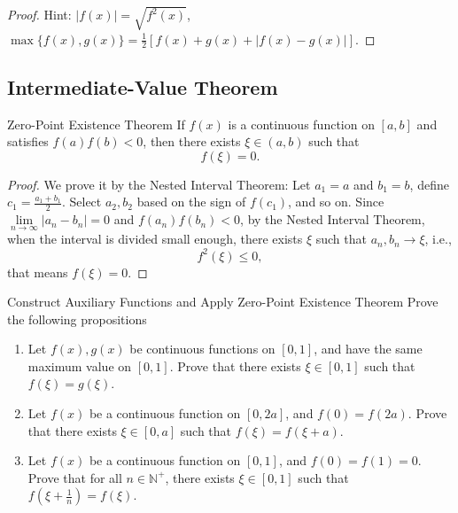 \begin{proof}
  Hint: $|f(x)| = \sqrt{f^2(x)}$,
  $\max \{f(x), g(x)\} = \frac{1}{2} \left[f(x) + g(x) + |f(x) - g(x)| \right]$.
\end{proof}

\subsection{Intermediate-Value Theorem}

\begin{theorem}{Zero-Point Existence Theorem}{}
  If $f(x)$ is a continuous function on $[a, b]$ and satisfies $f(a)f(b) < 0$,
  then there exists $\xi \in (a, b)$ such that
  \begin{equation}
    f(\xi) = 0.
  \end{equation}
\end{theorem}

\begin{proof}
  We prove it by the Nested Interval Theorem:
  Let $a_1 = a$ and $b_1 = b$, define $c_1 = \frac{a_1 + b_1}{2}$.
  Select $a_2, b_2$ based on the sign of $f(c_1)$,
  and so on.
  Since $\lim \limits _{n \rightarrow \infty} |a_n - b_n| = 0$ and $f(a_n)f(b_n)
  < 0$, by the Nested Interval Theorem,
  when the interval is divided small enough,
  there exists $\xi$ such that $a_n, b_n \rightarrow \xi$, i.e.,
  \begin{equation}
    f^2(\xi) \leq 0,
  \end{equation}
  that means $f(\xi) = 0$.
\end{proof}

\begin{example}{Construct Auxiliary Functions and Apply Zero-Point Existence Theorem}{}
  Prove the following propositions
  \begin{enumerate}
  \item Let $f(x), g(x)$ be continuous functions on $[0, 1]$,
    and have the same maximum value on $[0, 1]$.
    Prove that there exists $\xi \in [0, 1]$ such that $f(\xi) = g(\xi)$.
  \item Let $f(x)$ be a continuous function on $[0, 2a]$,
    and $f(0) = f(2a)$. Prove that there exists $\xi \in [0, a]$ such that
    $f(\xi) = f(\xi + a)$.
  \item Let $f(x)$ be a continuous function on $[0, 1]$,
    and $f(0) = f(1) = 0$. Prove that for all $n \in \mathbb{N}^+$,
    there exists $\xi \in [0, 1]$ such that $f(\xi + \frac{1}{n}) = f(\xi)$.
  \end{enumerate}
\end{example}

